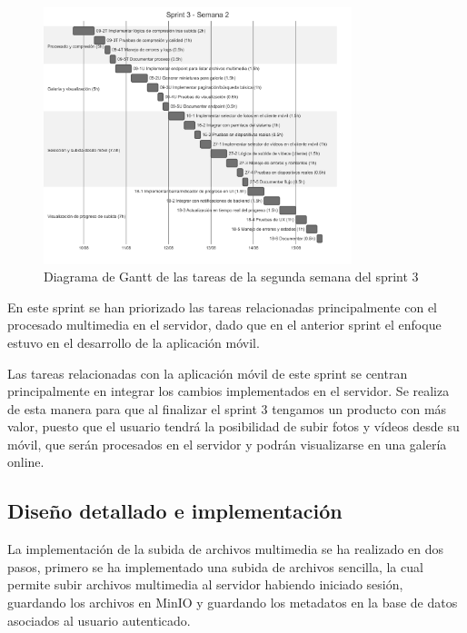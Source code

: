\begin{figure}[H]
    \begin{center}
        \includegraphics[width=0.8\textwidth]{assets/sprint3/week2-gantt.png}
    \end{center}
    \caption{Diagrama de Gantt de las tareas de la segunda semana del sprint 3}\label{fig:gantt-sprint3-week2}
\end{figure}

En este sprint se han priorizado las tareas relacionadas principalmente con el procesado multimedia en el servidor, dado que en el anterior sprint el enfoque estuvo en el desarrollo de la aplicación móvil.

Las tareas relacionadas con la aplicación móvil de este sprint se centran principalmente en integrar los cambios implementados en el servidor.
Se realiza de esta manera para que al finalizar el sprint 3 tengamos un producto con más valor, puesto que el usuario tendrá la posibilidad de subir fotos y vídeos desde su móvil, que serán procesados en el servidor y podrán visualizarse en una galería online.

\subsection{Diseño detallado e implementación}
La implementación de la subida de archivos multimedia se ha realizado en dos pasos, primero se ha implementado una subida de archivos sencilla, la cual permite subir archivos multimedia al servidor habiendo iniciado sesión, guardando los archivos en MinIO y guardando los metadatos en la base de datos asociados al usuario autenticado.

